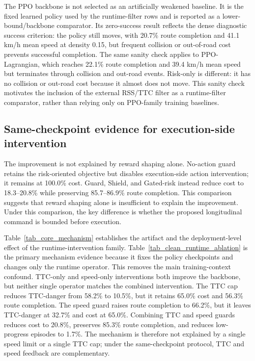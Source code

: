 \documentclass[pdflatex,sn-mathphys-ay]{sn-jnl}
\begin{document}


The PPO backbone is not selected as an artificially weakened baseline. It is the fixed learned policy used by the runtime-filter rows and is reported as a lower-bound/backbone comparator. Its zero-success result reflects the dense diagnostic success criterion: the policy still moves, with 20.7\% route completion and 41.1 km/h mean speed at density 0.15, but frequent collision or out-of-road cost prevents successful completion. The same sanity check applies to PPO-Lagrangian, which reaches 22.1\% route completion and 39.4 km/h mean speed but terminates through collision and out-road events. Risk-only is different: it has no collision or out-road cost because it almost does not move. This sanity check motivates the inclusion of the external RSS/TTC filter as a runtime-filter comparator, rather than relying only on PPO-family training baselines.

\subsection{Same-checkpoint evidence for execution-side intervention}\label{sec_mechanism}
The improvement is not explained by reward shaping alone. No-action guard retains the risk-oriented objective but disables execution-side action intervention; it remains at 100.0\% cost. Guard, Shield, and Gated-risk instead reduce cost to 18.3--20.8\% while preserving 85.7--86.9\% route completion. This comparison suggests that reward shaping alone is insufficient to explain the improvement. Under this comparison, the key difference is whether the proposed longitudinal command is bounded before execution.

Table~\ref{tab_core_mechanism} establishes the artifact and the deployment-level effect of the runtime-intervention family. Table~\ref{tab_clean_runtime_ablation} is the primary mechanism evidence because it fixes the policy checkpoints and changes only the runtime operator. This removes the main training-context confound. TTC-only and speed-only interventions both improve the backbone, but neither single operator matches the combined intervention. The TTC cap reduces TTC-danger from 58.2\% to 10.5\%, but it retains 65.0\% cost and 56.3\% route completion. The speed guard raises route completion to 66.2\%, but it leaves TTC-danger at 32.7\% and cost at 65.0\%. Combining TTC and speed guards reduces cost to 20.8\%, preserves 85.3\% route completion, and reduces low-progress episodes to 1.7\%. The mechanism is therefore not explained by a single speed limit or a single TTC cap; under the same-checkpoint protocol, TTC and speed feedback are complementary.
\end{document}

